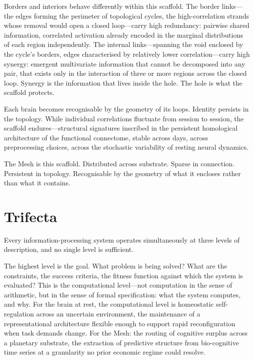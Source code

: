 Borders and interiors behave differently within this scaffold. The border links—the edges forming the perimeter of topological cycles, the high-correlation strands whose removal would open a closed loop—carry high redundancy: pairwise shared information, correlated activation already encoded in the marginal distributions of each region independently. The internal links—spanning the void enclosed by the cycle's borders, edges characterised by relatively lower correlation—carry high synergy: emergent multivariate information that cannot be decomposed into any pair, that exists only in the interaction of three or more regions across the closed loop. Synergy is the information that lives inside the hole. The hole is what the scaffold protects.

Each brain becomes recognisable by the geometry of its loops. Identity persists in the topology. While individual correlations fluctuate from session to session, the scaffold endures—structural signatures inscribed in the persistent homological architecture of the functional connectome, stable across days, across preprocessing choices, across the stochastic variability of resting neural dynamics.

The Mesh is this scaffold. Distributed across substrate. Sparse in connection. Persistent in topology. Recognisable by the geometry of what it encloses rather than what it contains.

\section{Trifecta}

Every information-processing system operates simultaneously at three levels of description, and no single level is sufficient.

The highest level is the goal. What problem is being solved? What are the constraints, the success criteria, the fitness function against which the system is evaluated? This is the computational level—not computation in the sense of arithmetic, but in the sense of formal specification: what the system computes, and why. For the brain at rest, the computational level is homeostatic self-regulation across an uncertain environment, the maintenance of a representational architecture flexible enough to support rapid reconfiguration when task demands change. For the Mesh: the routing of cognitive surplus across a planetary substrate, the extraction of predictive structure from bio-cognitive time series at a granularity no prior economic regime could resolve.


